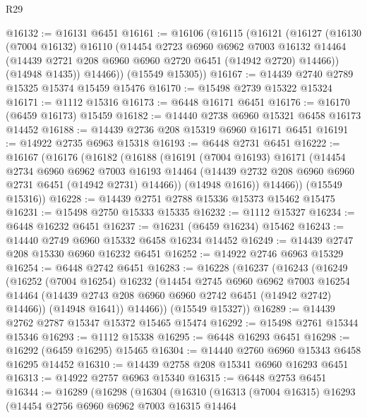 \begin{lexlean}{R29}
\begin{coremodule}
@16132 := @16131 @6451
@16161 := @16106
    (@16115
      (@16121
        (@16127
          (@16130
            (@7004 @16132)
            @16110
            (@14454
              @2723
              @6960
              @6962
              @7003
              @16132
              @14464
              (@14439 @2721 @208 @6960 @6960 @2720 @6451 (@14942 @2720) @14466))
            (@14948 @1435))
          @14466))
      (@15549 @15305))
@16167 := @14439 @2740 @2789 @15325 @15374 @15459 @15476
@16170 := @15498 @2739 @15322 @15324
@16171 := @1112 @15316
@16173 := @6448 @16171 @6451
@16176 := @16170 (@6459 @16173) @15459
@16182 := @14440 @2738 @6960 @15321 @6458 @16173 @14452
@16188 := @14439 @2736 @208 @15319 @6960 @16171 @6451
@16191 := @14922 @2735 @6963 @15318
@16193 := @6448 @2731 @6451
@16222 := @16167
    (@16176
      (@16182
        (@16188
          (@16191
            (@7004 @16193)
            @16171
            (@14454
              @2734
              @6960
              @6962
              @7003
              @16193
              @14464
              (@14439 @2732 @208 @6960 @6960 @2731 @6451 (@14942 @2731) @14466))
            (@14948 @1616))
          @14466))
      (@15549 @15316))
@16228 := @14439 @2751 @2788 @15336 @15373 @15462 @15475
@16231 := @15498 @2750 @15333 @15335
@16232 := @1112 @15327
@16234 := @6448 @16232 @6451
@16237 := @16231 (@6459 @16234) @15462
@16243 := @14440 @2749 @6960 @15332 @6458 @16234 @14452
@16249 := @14439 @2747 @208 @15330 @6960 @16232 @6451
@16252 := @14922 @2746 @6963 @15329
@16254 := @6448 @2742 @6451
@16283 := @16228
    (@16237
      (@16243
        (@16249
          (@16252
            (@7004 @16254)
            @16232
            (@14454
              @2745
              @6960
              @6962
              @7003
              @16254
              @14464
              (@14439 @2743 @208 @6960 @6960 @2742 @6451 (@14942 @2742) @14466))
            (@14948 @1641))
          @14466))
      (@15549 @15327))
@16289 := @14439 @2762 @2787 @15347 @15372 @15465 @15474
@16292 := @15498 @2761 @15344 @15346
@16293 := @1112 @15338
@16295 := @6448 @16293 @6451
@16298 := @16292 (@6459 @16295) @15465
@16304 := @14440 @2760 @6960 @15343 @6458 @16295 @14452
@16310 := @14439 @2758 @208 @15341 @6960 @16293 @6451
@16313 := @14922 @2757 @6963 @15340
@16315 := @6448 @2753 @6451
@16344 := @16289
    (@16298
      (@16304
        (@16310
          (@16313
            (@7004 @16315)
            @16293
            (@14454
              @2756
              @6960
              @6962
              @7003
              @16315
              @14464

\end{coremodule}
\end{lexlean}
